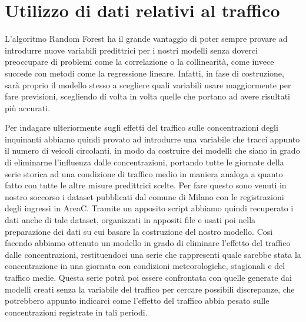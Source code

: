 \documentclass[a4paper]{report}
\begin{document}
\section{Utilizzo di dati relativi al traffico}
L'algoritmo Random Forest ha il grande vantaggio di poter sempre provare ad introdurre nuove variabili predittrici per i nostri modelli senza doverci preoccupare di problemi come la correlazione o la collinearità, come invece succede con metodi come la regressione lineare. Infatti, in fase di costruzione, sarà proprio il modello stesso a scegliere quali variabili usare maggiormente per fare previsioni, scegliendo di volta in volta quelle che portano ad avere risultati più accurati.

Per indagare ulteriormente sugli effetti del traffico sulle concentrazioni degli inquinanti abbiamo quindi provato ad introdurre una variabile che tracci appunto il numero di veicoli circolanti, in modo da costruire dei modelli che siano in grado di eliminarne l'influenza dalle concentrazioni, portando tutte le giornate della serie storica ad una condizione di traffico medio in maniera analoga a quanto fatto con tutte le altre misure predittrici scelte.
Per fare questo sono venuti in nostro soccorso i dataset \cite{areac2012, areac2013, areac2014, areac2015, areac2016, areac2017, areac2018, areac20192020}
 pubblicati dal comune di Milano con le registrazioni degli ingressi in AreaC. Tramite un apposito script
 abbiamo quindi recuperato i dati anche di tale dataset, organizzati in appositi file e usati poi nella preparazione dei dati su cui basare la costruzione del nostro modello. Cosi facendo abbiamo ottenuto un modello in grado di eliminare l'effetto del traffico dalle concentrazioni, restituendoci una serie che rappresenti quale sarebbe stata la concentrazione in una giornata con condizioni meteorologiche, stagionali e del traffico medie. Questa serie potrà poi essere confrontata con quelle generate dai modelli creati senza la variabile del traffico per cercare possibili discrepanze, che potrebbero appunto indicarci come l'effetto del traffico abbia pesato sulle concentrazioni registrate in tali periodi.
\end{document}
